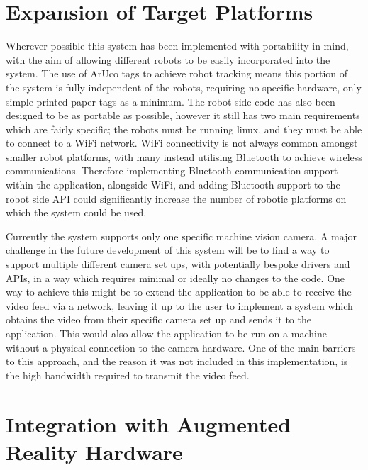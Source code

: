 
\section{Expansion of Target Platforms}

Wherever possible this system has been implemented with portability in mind, with the aim of allowing different robots to be easily incorporated into the system. The use of ArUco tags to achieve robot tracking means this portion of the system is fully independent of the robots, requiring no specific hardware, only simple printed paper tags as a minimum. The robot side code has also been designed to be as portable as possible, however it still has two main requirements which are fairly specific; the robots must be running linux, and they must be able to connect to a WiFi network. WiFi connectivity is not always common amongst smaller robot platforms, with many instead utilising Bluetooth to achieve wireless communications. Therefore implementing Bluetooth communication support within the application, alongside WiFi, and adding Bluetooth support to the robot side API could significantly increase the number of robotic platforms on which the system could be used.

Currently the system supports only one specific machine vision camera. A major challenge in the future development of this system will be to find a way to support multiple different camera set ups, with potentially bespoke drivers and APIs, in a way which requires minimal or ideally no changes to the code. One way to achieve this might be to extend the application to be able to receive the video feed via a network, leaving it up to the user to implement a system which obtains the video from their specific camera set up and sends it to the application. This would also allow the application to be run on a machine without a physical connection to the camera hardware. One of the main barriers to this approach, and the reason it was not included in this implementation, is the high bandwidth required to transmit the video feed.


\section{Integration with Augmented Reality Hardware}

